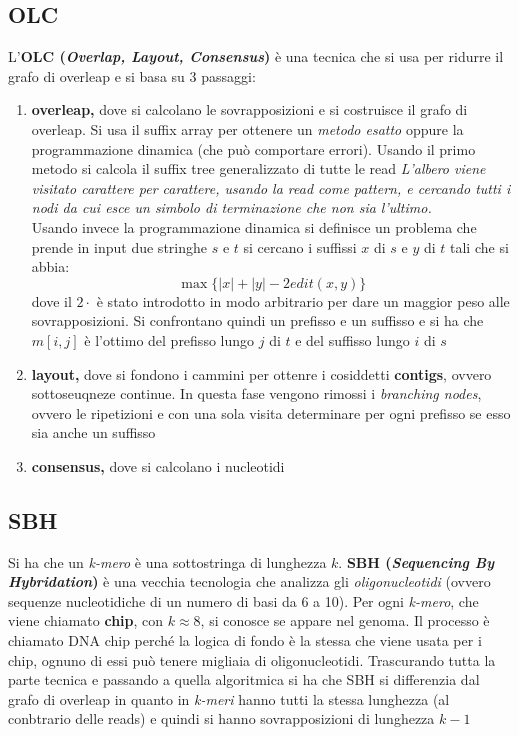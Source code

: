 \documentclass[a4paper,12pt, oneside]{book}
\begin{document}
\subsection{OLC}
L'\textbf{OLC (\textit{Overlap, Layout, Consensus})} è una tecnica che
si usa per ridurre il grafo di overleap e si basa su 3 passaggi:
\begin{enumerate}
  \item \textbf{overleap,} dove si calcolano le sovrapposizioni e si
  costruisce il grafo di overleap. Si usa il suffix array per ottenere
  un \textit{metodo esatto} oppure la programmazione dinamica (che può
  comportare errori). Usando il primo metodo si calcola il suffix tree
  generalizzato di tutte le read  \textit{L’albero viene visitato
    carattere per carattere, usando la read come pattern, e cercando
    tutti i nodi da cui esce un simbolo di terminazione che non sia
    l’ultimo.} \\
  Usando invece la programmazione dinamica si definisce un problema
  che prende in input due stringhe $s$ e $t$ si cercano i suffissi $x$
  di $s$ e $y$ di $t$ tali che si abbia:
  \[\max\{|x|+|y|-2edit(x,y)\}\]
  dove il $2\cdot$ è stato introdotto in modo arbitrario per dare un
  maggior peso alle sovrapposizioni. Si confrontano quindi un prefisso
  e un suffisso e si ha che $m[i,j]$ è l'ottimo del prefisso lungo $j$
  di $t$ e del suffisso lungo $i$ di $s$
  \item \textbf{layout,} dove si fondono i cammini per ottenre i
  cosiddetti \textbf{contigs}, ovvero sottoseuqneze continue. In
  questa fase vengono rimossi i \textit{branching nodes}, ovvero le
  ripetizioni e con una sola visita determinare per ogni prefisso se
  esso sia anche un suffisso
  \item \textbf{consensus,} dove si calcolano i nucleotidi
\end{enumerate}
\subsection{SBH}
Si ha che un \textit{k-mero} è una sottostringa di lunghezza $k$.
\textbf{SBH (\textit{Sequencing By Hybridation})} è una vecchia
tecnologia che analizza gli \textit{oligonucleotidi} (ovvero sequenze
nucleotidiche di un numero di basi da 6 a 10). Per ogni
\textit{k-mero}, che viene chiamato \textbf{chip}, con $k\approx 8$, si
conosce se appare nel genoma. Il processo è chiamato DNA chip perché
la logica di fondo è la stessa che viene usata per i chip, ognuno di
essi può tenere migliaia di oligonucleotidi. Trascurando tutta la
parte tecnica e passando a quella algoritmica si ha che SBH si
differenzia dal grafo di overleap in quanto in \textit{k-meri} hanno
tutti la stessa lunghezza (al conbtrario delle reads) e quindi si
hanno sovrapposizioni di lunghezza $k-1$
\end{document}
